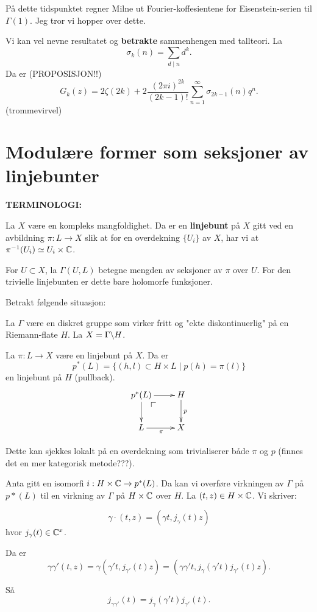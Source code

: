 \documentclass[11pt, english]{article}
\begin{document}
På dette tidspunktet regner Milne ut Fourier-koffesientene for Eisenstein-serien til $\Gamma(1)$. Jeg tror vi hopper over dette.

Vi kan vel nevne resultatet og \textbf{betrakte} sammenhengen med tallteori. La 
$$
\sigma_k(n) = \sum_{d \mid n} d^k.
$$
Da er (PROPOSISJON!!)
\[
G_k(z) = 2\zeta(2k) + 2\frac{(2\pi i) ^{2k}}{(2k-1)!} \sum_{n=1}^\infty \sigma_{2k-1}(n) q^n.
\]
(trommevirvel)


\section{Modulære former som seksjoner av linjebunter}

\textbf{TERMINOLOGI:}

La $X$ være en kompleks mangfoldighet. Da er en \textbf{linjebunt} på $X$ gitt ved en avbildning $\pi:L \to X$ slik at for en overdekning $\{ U_i \}$ av $X$, har vi at $\pi^{-1}(U_i) \simeq U_i \times \mathbb{C}$. 

For $U \subset X$, la  $\Gamma(U,L)$ betegne mengden av seksjoner av $\pi$ over $U$. For den trivielle linjebunten er dette bare holomorfe funksjoner.

Betrakt følgende situasjon:

La $\Gamma$ være en diskret gruppe som virker fritt og "ekte diskontinuerlig" på en Riemann-flate $H$. La $X = \Gamma \backslash H$.

La $\pi:L \to X$ være en linjebunt på $X$. Da er 
$$
p^\ast (L) = \{ (h,l) \subset H \times L \mid p(h) = \pi(l) \}
$$
en linjebunt på $H$ (pullback).
\[
\xymatrix{
p^\ast (L) \pullbackcorner \ar[r] \ar[d] & H \ar[d]^p \\
L \ar[r]_\pi & X
}
\]

Dette kan sjekkes lokalt på en overdekning som trivialiserer både $\pi$ og $p$ (finnes det en mer kategorisk metode???). 

Anta gitt en isomorfi $i: H \times \mathbb{C} \to p^\ast (L)$. Da kan vi overføre virkningen av $\Gamma$ på $p\ast (L)$ til en virkning av $\Gamma$ på $H \times \mathbb{C}$ over $H$.  La $(t,z) \in H \times \mathbb{C}$. Vi skriver:

$$
\gamma \cdot (t,z) = \left( \gamma t , j_\gamma(t)z \right)
$$
hvor $j_\gamma(t) \in \mathbb{C}^x$. 

Da er 
$$
\gamma \gamma' (t,z) = \gamma(\gamma' t, j_{\gamma '}(t)z ) = (\gamma \gamma' t, j_{\gamma}(\gamma' t) j_{\gamma'}(t) z).
$$

Så
$$
j_{\gamma \gamma'}(t) = j_\gamma(\gamma' t) j_{\gamma'}(t).
$$
\end{document}
